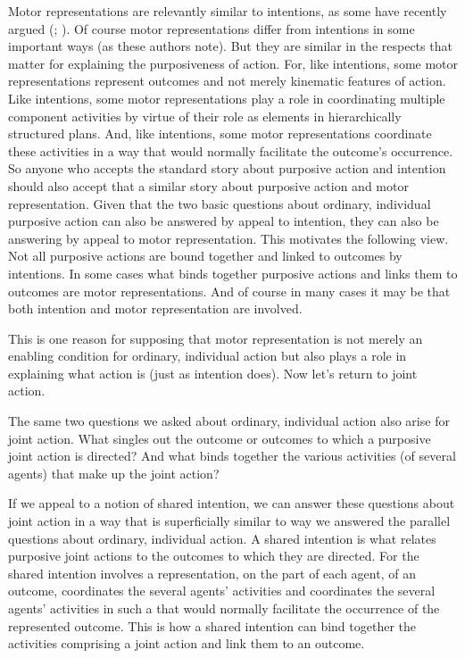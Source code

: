 \documentclass[12pt,\papersize]{extarticle}
\begin{document}
Motor representations are relevantly similar to intentions,
as some have recently argued (\citealp[pp.\ 189-90]{pacherie:2008_action}; \citealp{butterfill:2012_intention}).
Of course motor representations differ from intentions in some important ways (as these authors note).
But they are similar in the respects that matter for explaining the purposiveness of action.
For, like intentions, some motor representations represent outcomes and not merely kinematic features of action.
Like intentions, some motor representations play a role in coordinating multiple  component activities by virtue of their role as elements in hierarchically structured plans.
And, like intentions, some motor representations coordinate these activities in a way that would normally facilitate the outcome’s occurrence.
So anyone who accepts the standard story about purposive action and intention
should also accept that a similar story about purposive action and motor representation.
Given that the two basic questions about ordinary, individual purposive action can also be answered by appeal to intention,
they can also be answering by appeal to motor representation.
This motivates the following view.
Not all purposive actions are bound together and linked to outcomes by intentions. 
In some cases what binds together purposive actions and links them to outcomes are motor representations.
And of course in many cases it may be that both intention and motor representation are involved.

This is one reason for supposing that motor representation is not merely an enabling condition for ordinary, individual action but also plays a role in explaining what action is (just as intention does).
Now let’s return to joint action.

The same two questions we asked about ordinary, individual action also arise for joint action.
What singles out the outcome or outcomes to which a purposive joint action is directed?
And what binds together the various activities (of several agents) that make up the joint action?

If we appeal to a notion of shared intention,
we can answer these questions about joint action in a way that is superficially similar to way we answered the parallel questions about ordinary, individual action.
A shared intention is what relates purposive joint actions to the outcomes to which they are directed.
For the shared intention 
involves a representation, on the part of each agent, of an outcome,
coordinates the several agents’ activities
and 
coordinates the several agents’ activities in such a that would normally facilitate the occurrence of the represented outcome.
This is how a shared intention can bind together the activities comprising a joint action and link them to an outcome.
\end{document}
